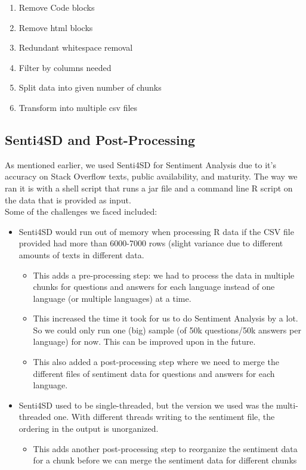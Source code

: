 \documentclass[conference]{IEEEtran}
\begin{document}
\begin{enumerate}
    \item Remove Code blocks
    \item Remove html blocks
    \item Redundant whitespace removal
    \item Filter by columns needed
    \item Split data into given number of chunks
    \item Transform into multiple csv files\\
\end{enumerate}

\subsection{Senti4SD and Post-Processing}
As mentioned earlier, we used Senti4SD for Sentiment Analysis due to it's accuracy on Stack Overflow texts, public availability, and maturity. The way we ran it is with a shell script that runs a jar file and a command line R script on the data that is provided as input.\\

Some of the challenges we faced included:
\begin{itemize}
    \item Senti4SD would run out of memory when processing R data if the CSV file provided had more than 6000-7000 rows (slight variance due to different amounts of texts in different data.
    \begin{itemize}
        \item This adds a pre-processing step: we had to process the data in multiple chunks for questions and answers for each language instead of one language (or multiple languages) at a time.
        \item This increased the time it took for us to do Sentiment Analysis by a lot. So we could only run one (big) sample (of 50k questions/50k answers per language) for now. This can be improved upon in the future.
        \item This also added a post-processing step where we need to merge the different files of sentiment data for questions and answers for each language.
    \end{itemize}
    \item Senti4SD used to be single-threaded, but the version we used was the multi-threaded one. With different threads writing to the sentiment file, the ordering in the output is unorganized. 
    \begin{itemize}
        \item This adds another post-processing step to reorganize the sentiment data for a chunk before we can merge the sentiment data for different chunks\\
    \end{itemize}
\end{itemize}
\end{document}
